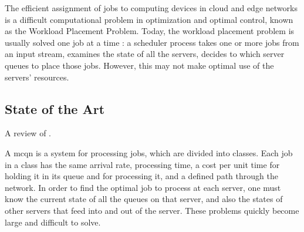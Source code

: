 \documentclass[11pt,a4paper,titlepage]{article}
\theoremstyle{definition}
\theoremstyle{plain}
\begin{document}
    The efficient assignment of jobs to computing devices in cloud and edge networks is a difficult computational problem in optimization and optimal control,
    known as the Workload Placement Problem.
    Today,
    the workload placement problem is usually solved one job at a time \autocite{10.1145/3391196,youssef_2020}:
    a scheduler process takes one or more jobs from an input stream,
    examines the state of all the servers,
    decides to which server queues to place those jobs.
    However,
    this may not make optimal use of the servers' resources.

    \subsection{State of the Art}
    \label{subsec:theory:state_of_the_art}

    A review of \autocite{bertsimas2014robust}.

    A \gls{mcqn} is a system for processing jobs,
    which are divided into classes.
    Each job in a class has the same arrival rate,
    processing time,
    a cost per unit time for holding it in its queue and for processing it,
    and a defined path through the network.
    In order to find the optimal job to process at each server,
    one must know the current state of all the queues on that server,
    and also the states of other servers that feed into and out of the server.
    These problems quickly become large and difficult to solve.

\end{document}

